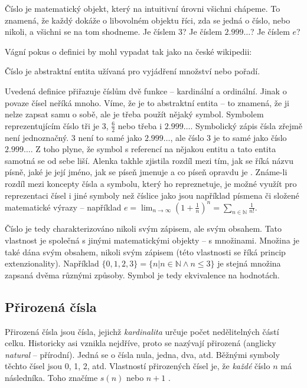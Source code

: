 Číslo je matematický objekt, který na intuitivní úrovni všichni chápeme. To znamená, že každý dokáže o libovolném objektu říci, zda se jedná o číslo, nebo nikoli, a všichni se na tom shodneme. Je číslem $3$? Je číslem $2.999\ldots$? Je číslem $e$? 

Vágní pokus o definici by mohl vypadat tak jako na české wikipedii:

\begin{definition}
Číslo je abstraktní entita užívaná pro vyjádření množství nebo pořadí.
\end{definition}

Uvedená definice přiřazuje číslům dvě funkce -- kardinální a ordinální. Jinak o povaze čísel neříká mnoho. Víme, že je to abstraktní entita -- to znamená, že ji nelze zapsat samu o sobě, ale je třeba použít nějaký symbol. Symbolem reprezentujícím číslo tři je $3$, $\frac{6}{2}$ nebo třeba i $2.999\ldots$. Symbolický zápis čísla zřejmě není jednoznačný. $3$ není to samé jako $2.999\ldots$, ale číslo $3$ je to samé jako číslo $2.999\ldots$. Z toho plyne, že symbol s referencí na nějakou entitu a tato entita samotná se od sebe liší. Alenka takhle zjistila rozdíl mezi tím, jak se říká názvu písně, jaké je její jméno, jak se píseň jmenuje a co píseň opravdu je \cite{TtLG}. Známe-li rozdíl mezi koncepty čísla a symbolu, který ho repreznetuje, je možné využít pro reprezentaci čísel i jiné symboly než číslice jako jsou například písmena či složené matematické výrazy -- například $e = \lim_{n \to \infty} \left(1 +\frac{1}{n} \right)^n = \sum_{n\in\mathbb{N}}\frac{1}{n!}$.

Číslo je tedy charakterizováno nikoli svým zápisem, ale svým obsahem. Tato vlastnost je společná s jinými matematickými objekty -- s množinami. Množina je také dána svým obsahem, nikoli svým zápisem (této vlastnosti se říká princip extenzionality). Například $\{0, 1, 2, 3 \} = \{ n | n \in \mathbb{N} \land n \leq 3 \}$ je stejná množina zapsaná dvěma různými způsoby. Symbol \uv{$=$} je tedy ekvivalence na hodnotách.

\subsection{Přirozená čísla}
Přirozená čísla jsou čísla, jejichž \textit{kardinalita} určuje počet nedělitelných částí celku. Historicky asi vznikla nejdříve, proto se nazývají přirozená (anglicky \textit{natural} -- přírodní). Jedná se o čísla nula, jedna, dva, atd. Běžnými symboly těchto čísel jsou 0, 1, 2, atd. Vlastností přirozených čísel je, že \textit{každé} číslo $n$ má následníka. Toho značíme $s(n)$ nebo $n+1$ \cite{LambdaCalcul}.

